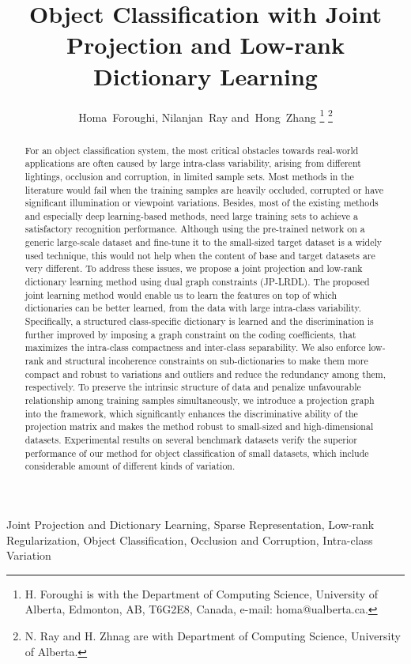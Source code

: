 \documentclass[journal]{IEEEtran}
\begin{document}
\title{Object Classification with Joint Projection and Low-rank Dictionary Learning}

\author{Homa~Foroughi, Nilanjan~Ray and~Hong~Zhang 
\thanks{H. Foroughi is with the Department
of Computing Science, University of Alberta, Edmonton,
AB, T6G2E8, Canada, e-mail: homa@ualberta.ca.}%
\thanks{N. Ray and H. Zhnag are with Department of Computing Science, University of Alberta.}}



\maketitle
\begin{abstract}
For an object classification system, the most critical obstacles towards real-world applications are often caused by large intra-class variability, arising from different lightings, occlusion and corruption, in limited sample sets. Most methods in the literature would fail when the training samples are heavily occluded, corrupted or have significant illumination or viewpoint variations. Besides, most of the existing methods and especially deep learning-based methods, need large training sets to achieve a satisfactory recognition performance. Although using the pre-trained network on a generic large-scale dataset and fine-tune it to the small-sized target dataset is a widely used technique, this would not help when the content of base and target datasets are very different.
To address these issues, we propose a joint projection and low-rank dictionary learning method using dual graph constraints (JP-LRDL). The proposed joint learning method would enable us to learn the features on top of which dictionaries can be better learned, from the data with large intra-class variability. Specifically, a structured class-specific dictionary is learned and the discrimination is further improved by imposing a graph constraint on the coding coefficients, that maximizes the intra-class compactness and inter-class separability. We also enforce low-rank and structural incoherence constraints on sub-dictionaries to make them more compact and robust to variations and outliers and reduce the redundancy among them, respectively. To preserve the intrinsic structure of data and penalize unfavourable relationship among training samples simultaneously, we introduce a projection graph into the framework, which significantly enhances the discriminative ability of the projection matrix and makes the method robust to small-sized and high-dimensional datasets. Experimental results on several benchmark datasets verify the superior performance of our method for object classification of small datasets, which include considerable amount of different kinds of variation.
\end{abstract}
\begin{IEEEkeywords}
Joint Projection and Dictionary Learning, Sparse Representation, Low-rank Regularization, Object Classification, Occlusion and Corruption, Intra-class Variation
\end{IEEEkeywords}
\end{document}
